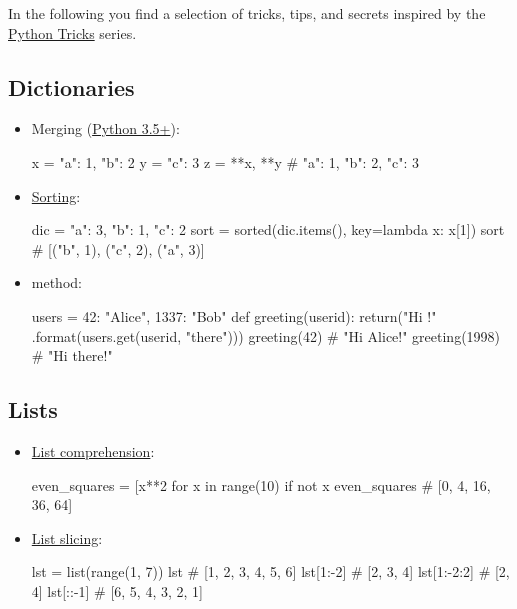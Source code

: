 \documentclass[rules]{cheatsheet}
\begin{document}
In the following you find a selection of tricks, tips, and secrets inspired by the \href{https://realpython.com/python-tricks/}{Python Tricks} series.

\subsection{Dictionaries}

\begin{itemize}
  \item Merging (\href{https://docs.python.org/3/whatsnew/3.5.html}{Python 3.5+}):
  \begin{python}[gobble=4]
    x = {"a": 1, "b": 2}
    y = {"c": 3}
    z = {**x, **y} # {"a": 1, "b": 2, "c": 3}
  \end{python}

  \item \href{https://docs.python.org/3/howto/sorting.html}{Sorting}:
  \begin{python}[gobble=4]
    dic = {"a": 3, "b": 1, "c": 2}
    sort = sorted(dic.items(), key=lambda x: x[1])
    sort # [("b", 1), ("c", 2), ("a", 3)]
  \end{python}

  \item \href{https://docs.python.org/3/library/stdtypes.html#dict.get}{} method:
  \begin{python}[gobble=4]
    users = {42: "Alice", 1337: "Bob"}
    def greeting(userid):
      return("Hi {}!"
             .format(users.get(userid, "there")))
    greeting(42) # "Hi Alice!"
    greeting(1998) # "Hi there!"
  \end{python}
\end{itemize}

\subsection{Lists}

\begin{itemize}
  \item \href{https://docs.python.org/3/library/stdtypes.html#list}{List comprehension}:
  \begin{python}[gobble=4]
    even_squares = [x**2 for x in range(10)
                    if not x %
    even_squares # [0, 4, 16, 36, 64]
  \end{python}

  \item \href{https://docs.python.org/3/library/stdtypes.html#sequence-types-list-tuple-range}{List slicing}:
  \begin{python}[gobble=4]
    lst = list(range(1, 7))
    lst # [1, 2, 3, 4, 5, 6]
    lst[1:-2] # [2, 3, 4]
    lst[1:-2:2] # [2, 4]
    lst[::-1] # [6, 5, 4, 3, 2, 1]
  \end{python}
\end{itemize}
\end{document}
